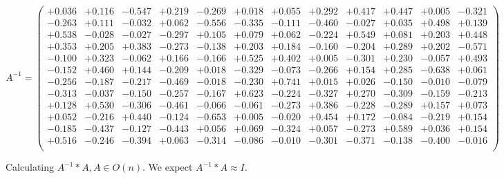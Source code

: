 \documentclass[9pt]{article}
\theoremstyle{plain}
\theoremstyle{definition}
\theoremstyle{remark}
\numberwithin{equation}{section}
\begin{document}
$A^{-1} = \left(
\begin{array}{
cccccccccccc}
+0.036 & +0.116 & -0.547 & +0.219 & -0.269 & +0.018 & +0.055 & +0.292 & +0.417 & +0.447 & +0.005 & -0.321 \\
-0.263 & +0.111 & -0.032 & +0.062 & -0.556 & -0.335 & -0.111 & -0.460 & -0.027 & +0.035 & +0.498 & +0.139 \\
+0.538 & -0.028 & -0.027 & -0.297 & +0.105 & +0.079 & +0.062 & -0.224 & +0.549 & +0.081 & +0.203 & +0.448 \\
+0.353 & +0.205 & +0.383 & -0.273 & -0.138 & +0.203 & +0.184 & -0.160 & -0.204 & +0.289 & +0.202 & -0.571 \\
-0.100 & +0.323 & -0.062 & +0.166 & -0.166 & +0.525 & +0.402 & +0.005 & -0.301 & +0.230 & -0.057 & +0.493 \\
-0.152 & +0.460 & +0.144 & -0.209 & +0.018 & -0.329 & -0.073 & -0.266 & +0.154 & +0.285 & -0.638 & +0.061 \\
-0.256 & -0.187 & -0.217 & -0.469 & -0.018 & -0.230 & +0.741 & +0.015 & +0.026 & -0.150 & -0.010 & -0.079 \\
-0.313 & -0.037 & -0.150 & -0.257 & -0.167 & +0.623 & -0.224 & -0.327 & +0.270 & -0.309 & -0.159 & -0.213 \\
+0.128 & +0.530 & -0.306 & -0.461 & -0.066 & -0.061 & -0.273 & +0.386 & -0.228 & -0.289 & +0.157 & +0.073 \\
+0.052 & -0.216 & +0.440 & -0.124 & -0.653 & +0.005 & -0.020 & +0.454 & +0.172 & -0.084 & -0.219 & +0.154 \\
-0.185 & -0.437 & -0.127 & -0.443 & +0.056 & +0.069 & -0.324 & +0.057 & -0.273 & +0.589 & +0.036 & +0.154 \\
+0.516 & -0.246 & -0.394 & +0.063 & -0.314 & -0.086 & -0.010 & -0.301 & -0.371 & -0.138 & -0.400 & -0.016 \\
\end{array}
\right)$ \newline 

Calculating $A^{-1} *A  ,  A \in O(n)$.   We expect $A^{-1} *A  \approx I$. 
\end{document}

